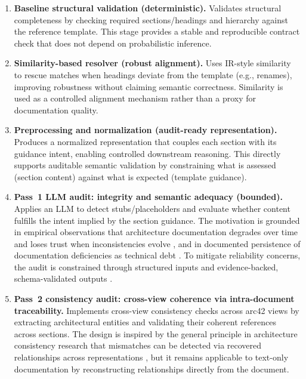 \begin{enumerate}
    \item \textbf{Baseline structural validation (deterministic).}
    Validates structural completeness by checking required sections/headings and hierarchy against the reference template. This stage provides a stable and reproducible contract check that does not depend on probabilistic inference.

    \item \textbf{Similarity-based resolver (robust alignment).}
    Uses IR-style similarity to rescue matches when headings deviate from the template (e.g., renames), improving robustness without claiming semantic correctness. Similarity is used as a controlled alignment mechanism rather than a proxy for documentation quality.

    \item \textbf{Preprocessing and normalization (audit-ready representation).}
    Produces a normalized representation that couples each section with its guidance intent, enabling controlled downstream reasoning. This directly supports auditable semantic validation by constraining what is assessed (section content) against what is expected (template guidance).

    \item \textbf{Pass~1 LLM audit: integrity and semantic adequacy (bounded).}
    Applies an LLM to detect stubs/placeholders and evaluate whether content fulfills the intent implied by the section guidance. The motivation is grounded in empirical observations that architecture documentation degrades over time and loses trust when inconsistencies evolve \cite{wohlrab_icsa19_guidelines}, and in documented persistence of documentation deficiencies as technical debt \cite{mendes_doc_td}. To mitigate reliability concerns, the audit is constrained through structured inputs and evidence-backed, schema-validated outputs \cite{llm4se_slr}.

    \item \textbf{Pass~2 consistency audit: cross-view coherence via intra-document traceability.}
    Implements cross-view consistency checks across arc42 views by extracting architectural entities and validating their coherent references across sections. The design is inspired by the general principle in architecture consistency research that mismatches can be detected via recovered relationships across representations \cite{ardoco_icsa23}, but it remains applicable to text-only documentation by reconstructing relationships directly from the document.
\end{enumerate}

